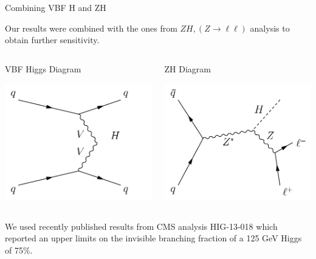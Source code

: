 \documentclass[8pt]{beamer}
\begin{document}
\begin{frame}{Combining VBF H and ZH}
 
Our results were combined with the ones from $ZH, (Z \rightarrow \ell\ell)$  analysis to obtain further sensitivity.
 
\begin{columns}
 
\begin{block}{VBF Higgs Diagram}
 
\centering
\includegraphics[width=0.8\linewidth]{img/feyn_VBF.pdf} 

\end{block}

\begin{block}{ZH Diagram}
 
\centering
\includegraphics[width=0.8\linewidth]{img/feyn_Zll.pdf} 

\end{block}

\end{columns}

We used recently published results from CMS analysis  HIG-13-018 which reported an upper limits on the invisible branching fraction of a 125 GeV Higgs of 75\%.

\end{frame}
\end{document}
